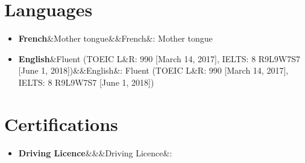 \documentclass[a4paper,11pt]{article}
\newcommand{\basicItem}[2]{%
  \item\small{%
    \textbf{#1}{\ifx&#2&\else\ifx&#1&\else: \fi#2\vspace{-2pt}\fi}
  }
}
\newcommand{\headingSubItem}[2]{\basicItem{#1}{#2}\vspace{-4pt}}
\begin{document}
\section{Languages}
\begin{itemize}[leftmargin=*]
  \headingSubItem{French}{Mother tongue}
  \headingSubItem{English}{Fluent (TOEIC L\&R\@: 990 [March 14, 2017], IELTS\@: 8 R9L9W7S7 [June 1, 2018])}
\end{itemize}


\section{Certifications}
\begin{itemize}[leftmargin=*]
  \headingSubItem{Driving Licence}{}
\end{itemize}
\end{document}
